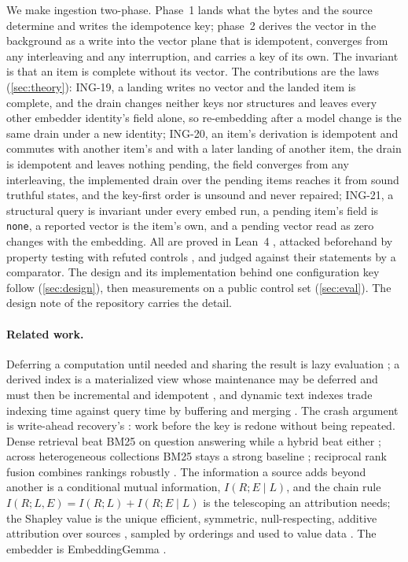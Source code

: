 \documentclass[11pt]{article}
\theoremstyle{plain}
\theoremstyle{definition}
\theoremstyle{remark}
\newcommand{\lean}[1]{\texttt{#1}}
\newcommand{\ing}[1]{ING-#1}
\begin{document}
We make ingestion two-phase. Phase~1 lands what the bytes and the source determine and writes the
idempotence key; phase~2 derives the vector in the background as a write into the vector plane
that is idempotent, converges from any interleaving and any interruption, and carries a key of
its own. The invariant is that an item is complete without its vector. The contributions are the
laws (\cref{sec:theory}): \ing{19}, a landing writes no vector and the landed item is complete,
and the drain changes neither keys nor structures and leaves every other embedder identity's field
alone, so re-embedding after a model change is the same drain under a new identity; \ing{20}, an
item's derivation is idempotent and commutes with another item's and with a later landing of
another item, the drain is idempotent and leaves nothing pending, the field converges from any
interleaving, the implemented drain over the pending items reaches it from sound truthful states,
and the key-first order is unsound and never repaired; \ing{21}, a structural query is invariant
under every embed run, a pending item's field is \lean{none}, a reported vector is the item's own,
and a pending vector read as zero changes with the embedding. All are proved in Lean~4
\citep{demoura2021,mathlib2020}, attacked beforehand by property testing with refuted controls
\citep{claessen2000}, and judged against their statements by a comparator. The design and its
implementation behind one configuration key follow (\cref{sec:design}), then measurements on a
public control set (\cref{sec:eval}). The design note of the repository carries the detail.

\paragraph{Related work.} Deferring a computation until needed and sharing the result is lazy
evaluation \citep{henderson1976lazy}; a derived index is a materialized view whose maintenance may
be deferred and must then be incremental and idempotent \citep{gupta1995views}, and dynamic text
indexes trade indexing time against query time by buffering and merging
\citep{buttcher2005tradeoffs,lester2006online}. The crash argument is write-ahead recovery's
\citep{mohan1992aries}: work before the key is redone without being repeated. Dense retrieval beat
BM25 on question answering while a hybrid beat either \citep{karpukhin2020dpr}; across
heterogeneous collections BM25 stays a strong baseline \citep{thakur2021beir}; reciprocal rank
fusion combines rankings robustly \citep{cormack2009rrf}. The information a source adds beyond
another is a conditional mutual information, $I(R; E \mid L)$, and the chain rule
$I(R; L, E) = I(R; L) + I(R; E \mid L)$ \citep{cover2006} is the telescoping an attribution needs;
the Shapley value is the unique efficient, symmetric, null-respecting, additive attribution over
sources \citep{shapley1953value}, sampled by orderings \citep{castro2009polynomial} and used to
value data \citep{ghorbani2019data}. The embedder is EmbeddingGemma \citep{vera2025embeddinggemma}.
\end{document}
